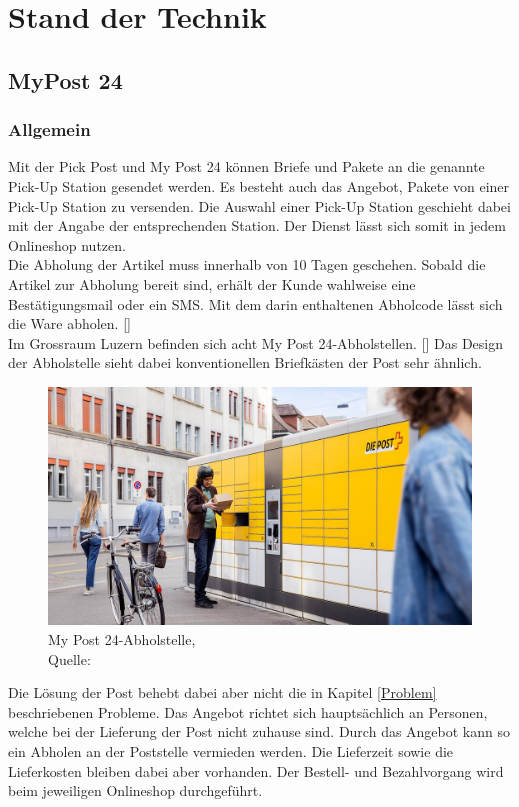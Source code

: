 \section{Stand der Technik}\label{StandDerTechnik}
\subsection{MyPost 24}
\subsubsection{Allgemein}
Mit der Pick Post und My Post 24 können Briefe und Pakete an die genannte Pick-Up Station gesendet werden. Es besteht auch das Angebot, Pakete von einer Pick-Up Station zu versenden. 
Die Auswahl einer Pick-Up Station geschieht dabei mit der Angabe der entsprechenden Station. Der Dienst lässt sich somit in jedem Onlineshop nutzen.\\
Die Abholung der Artikel muss innerhalb von 10 Tagen geschehen. Sobald die Artikel zur Abholung bereit sind, erhält der Kunde wahlweise eine Bestätigungsmail oder ein SMS. Mit dem darin enthaltenen Abholcode lässt sich die Ware abholen. 
[\cite{postPickUp}]\\
Im Grossraum Luzern befinden sich acht My Post 24-Abholstellen. [\cite{myPost24Stations}]
Das Design der Abholstelle sieht dabei konventionellen Briefkästen der Post sehr ähnlich. 
\begin{figure}[H]
	\centering
	\includegraphics[width=1\textwidth]{images/myPostImage.jpg}
	\caption[My Post 24-Abholstelle]{My Post 24-Abholstelle,\\ Quelle: \cite{myPost24StationsImage}}
	\label{img: My Post 24-Abholstelle}
\end{figure}
Die Lösung der Post behebt dabei aber nicht die in Kapitel \ref{Problem} beschriebenen Probleme. Das Angebot richtet sich hauptsächlich an Personen, welche bei der Lieferung der Post nicht zuhause sind. Durch das Angebot kann so ein Abholen an der Poststelle vermieden werden. Die Lieferzeit sowie die Lieferkosten bleiben dabei aber vorhanden. Der Bestell- und Bezahlvorgang wird beim jeweiligen Onlineshop durchgeführt. 
\newpage 
